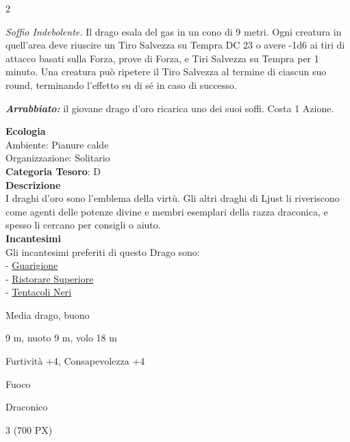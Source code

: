 \begin{multicols}{2}
{\emph{Soffio Indebolente.} Il drago esala del gas in un cono di 9 metri. Ogni creatura in quell'area deve riuscire un Tiro Salvezza su Tempra DC 23 o avere -1d6 ai tiri di attacco basati sulla Forza, prove di Forza, e Tiri Salvezza su Tempra per 1 minuto. Una creatura può ripetere il Tiro Salvezza al termine di ciascun suo round, terminando l'effetto su di sé in caso di successo.

\emph{\textbf{Arrabbiato:}} il giovane drago d'oro ricarica uno dei suoi soffi. Costa 1 Azione.

\textbf{Ecologia}\\
Ambiente: Pianure calde\\
Organizzazione: Solitario\\
\textbf{Categoria Tesoro}: D\\
\textbf{Descrizione}\\
I draghi d'oro sono l'emblema della virtù. Gli altri draghi di Ljust li riveriscono come agenti delle potenze divine e membri esemplari della razza draconica, e spesso li cercano per consigli o aiuto.\\
\textbf{Incantesimi}\\
Gli incantesimi preferiti di questo Drago sono:\\
- \hyperlink{Guarigione}{Guarigione}\\
- \hyperlink{Ristorare Superiore}{Ristorare Superiore}\\
- \hyperlink{Tentacoli Neri}{Tentacoli Neri}

\begin{description}[noitemsep, topsep=0pt, parsep=0pt, partopsep=0pt, itemsep=1pt, leftmargin=2.35cm,  labelwidth=2.2cm, itemindent=0cm, listparindent=0pt] %
\setlength{\baselineskip}{10pt}
\item[\textbf{Taglia/Tipo}] Media drago, buono
\item[\textbf{Caratt.}] 
\item[\textbf{Punti Ferita}] 
\item[\textbf{Movimento}] 9 m, nuoto 9 m, volo 18 m
\item[\textbf{Tiri Salvez.}] 
\item[\textbf{Comp.}] Furtività +4, Consapevolezza +4
\item[\textbf{Imm. Danni}] Fuoco
\item[\textbf{Sensi}] 
\item[\textbf{Linguaggi}] Draconico
\item[\textbf{Sfida}] 3 (700 PX)
\end{description}
\smallskip

}
\end{multicols}

